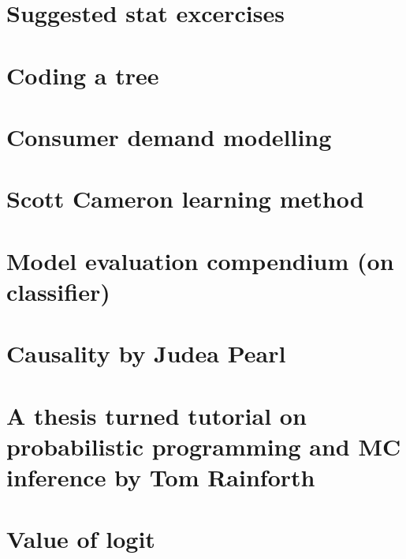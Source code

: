 \documentclass[letterpaper,10pt,english]{sphinxmanual}
\begin{document}
\section{Suggested stat excercises}
\label{\detokenize{tweets:suggested-stat-excercises}}



\section{Coding a tree}
\label{\detokenize{tweets:coding-a-tree}}



\section{Consumer demand modelling}
\label{\detokenize{tweets:consumer-demand-modelling}}



\section{Scott Cameron learning method}
\label{\detokenize{tweets:scott-cameron-learning-method}}



\section{Model evaluation compendium (on classifier)}
\label{\detokenize{tweets:model-evaluation-compendium-on-classifier}}



\section{Causality by Judea Pearl}
\label{\detokenize{tweets:causality-by-judea-pearl}}



\section{A thesis turned tutorial on probabilistic programming and MC inference by Tom Rainforth}
\label{\detokenize{tweets:a-thesis-turned-tutorial-on-probabilistic-programming-and-mc-inference-by-tom-rainforth}}



\section{Value of logit}
\label{\detokenize{tweets:value-of-logit}}
\end{document}

